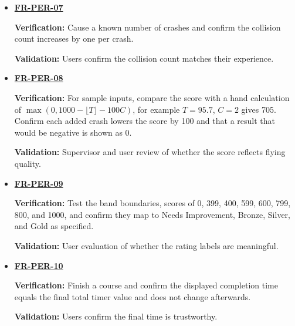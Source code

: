 \documentclass[12pt]{article}
\begin{document}
\begin{itemize}
 resume when flight continues.\par
 \textbf{Validation:} Users confirm that menu time does not affect performance.
\item \hyperlink{req:FR-PER-07}{\textbf{FR-PER-07}}\par
 \textbf{Verification:} Cause a known number of crashes and confirm the
 collision count increases by one per crash.\par
 \textbf{Validation:} Users confirm the collision count matches their experience.
\item \hyperlink{req:FR-PER-08}{\textbf{FR-PER-08}}\par
 \textbf{Verification:} For sample inputs, compare the score with a hand
 calculation of $\max(0,1000-\lfloor T\rfloor-100C)$, for example $T=95.7$,
 $C=2$ gives 705. Confirm each added crash lowers the score by 100 and that
 a result that would be negative is shown as 0.\par
 \textbf{Validation:} Supervisor and user review of whether the score reflects
 flying quality.
\item \hyperlink{req:FR-PER-09}{\textbf{FR-PER-09}}\par
 \textbf{Verification:} Test the band boundaries, scores of 0, 399, 400,
 599, 600, 799, 800, and 1000, and confirm they map to Needs Improvement,
 Bronze, Silver, and Gold as specified.\par
 \textbf{Validation:} User evaluation of whether the rating labels are meaningful.
\item \hyperlink{req:FR-PER-10}{\textbf{FR-PER-10}}\par
 \textbf{Verification:} Finish a course and confirm the displayed completion
 time equals the final total timer value and does not change afterwards.\par
 \textbf{Validation:} Users confirm the final time is trustworthy.
\end{itemize}
\end{document}
